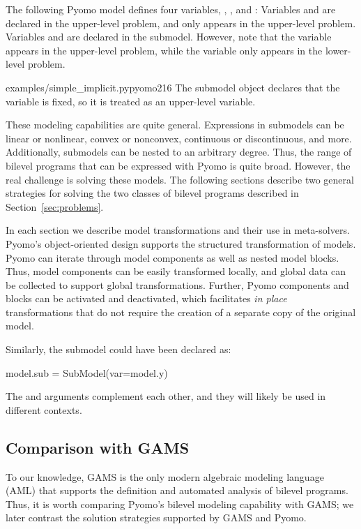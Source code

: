 \newpage
The following Pyomo model defines four variables, , ,  and :
Variables  and  are declared in the upper-level
problem, and  only appears in the upper-level problem.
Variables  and  are declared in the submodel.
However, note that the  variable appears in the upper-level
problem, while the  variable only appears in the
lower-level problem.

 {examples/simple_implicit.py}{pyomo}{2}{16}
The submodel object declares that the  variable is fixed,
so it is treated as an upper-level variable.  
\fi

These modeling capabilities are quite general.  Expressions in
submodels can be linear or nonlinear, convex or nonconvex, continuous
or discontinuous, and more.  Additionally, submodels can be nested
to an arbitrary degree.  Thus, the range of bilevel programs that
can be expressed with Pyomo is quite broad.  However, the real
challenge is solving these models.  The following sections describe
two general strategies for solving the two classes of bilevel
programs described in Section~\ref{sec:problems}.

In each section we describe model transformations and their use in
meta-solvers.  Pyomo's object-oriented design supports the structured
transformation of models.  Pyomo can iterate through model components
as well as nested model blocks.  Thus, model components can be
easily transformed locally, and global data can be collected to
support global transformations.  Further, Pyomo components and
blocks can be activated and deactivated, which facilitates \textit{in
place} transformations that do not require the creation of a separate
copy of the original model.



Similarly, the submodel could have been declared as:
\begin{qlisting}
model.sub = SubModel(var=model.y)
\end{qlisting}
The  and  arguments complement each other,
and they will likely be used in different contexts.
\fi


\subsection{Comparison with GAMS}
\label{gams}

To our knowledge, GAMS is the only modern algebraic modeling language
(AML) that supports the definition and automated analysis of bilevel
programs.  Thus, it is worth comparing Pyomo's bilevel modeling
capability with GAMS; we later contrast the solution strategies
supported by GAMS and Pyomo.

